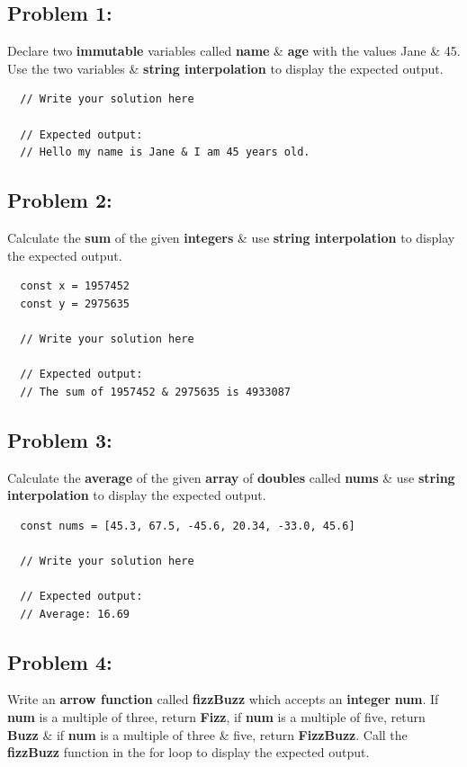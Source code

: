 \documentclass{article}
\begin{document}
\subsection*{Problem 1:} 
Declare two \textbf{immutable} variables called \textbf{name} \& \textbf{age} with the values Jane \& 45. Use the two variables \& \textbf{string interpolation} to display the expected output. 

\begin{verbatim}
  // Write your solution here

  // Expected output:
  // Hello my name is Jane & I am 45 years old.
\end{verbatim}

\subsection*{Problem 2:} 
Calculate the \textbf{sum} of the given \textbf{integers} \& use \textbf{string interpolation} to display the expected output.

\begin{verbatim}
  const x = 1957452
  const y = 2975635

  // Write your solution here

  // Expected output:
  // The sum of 1957452 & 2975635 is 4933087
\end{verbatim}

\subsection*{Problem 3:} 
Calculate the \textbf{average} of the given \textbf{array} of \textbf{doubles} called \textbf{nums} \& use \textbf{string interpolation} to display the expected output.

\begin{verbatim}
  const nums = [45.3, 67.5, -45.6, 20.34, -33.0, 45.6]

  // Write your solution here

  // Expected output:
  // Average: 16.69 
\end{verbatim}

\subsection*{Problem 4:}
Write an \textbf{arrow function} called \textbf{fizzBuzz} which accepts an \textbf{integer} \textbf{num}. If \textbf{num} is a multiple of three, return \textbf{Fizz}, if \textbf{num} is a multiple of five, return \textbf{Buzz} \& if \textbf{num} is a multiple of three \& five, return \textbf{FizzBuzz}. Call the \textbf{fizzBuzz} function in the for loop to display the expected output.
\end{document}
